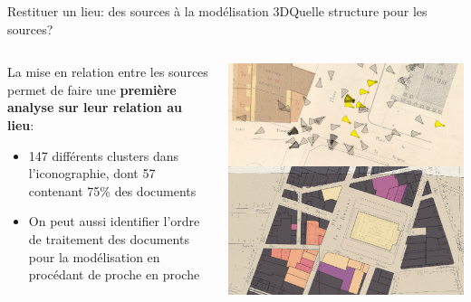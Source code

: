 \documentclass[8pt]{beamer}
\begin{document}
\begin{frame}{Restituer un lieu: des sources à la modélisation 3D}{Quelle structure pour les sources?}
	\begin{columns}[c]
		\begin{column}{0.4\textwidth}
			La mise en relation entre les sources permet de faire une \textbf{première analyse sur leur relation au lieu}:
			\begin{itemize}
				\item 147 différents clusters dans l’iconographie, dont 57 contenant 75\% des documents
				\item On peut aussi identifier l’ordre de traitement des documents pour la modélisation en procédant de proche en proche
			\end{itemize}
		\end{column}
		\begin{column}{0.6\textwidth}
			\includegraphics[width=\textwidth]{includes/c_slide6.png}
		\end{column}
	\end{columns}
\end{frame}
\end{document}
